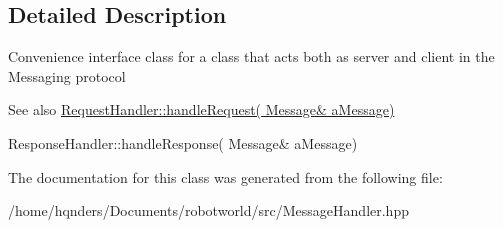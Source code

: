 \subsection{Detailed Description}
Convenience interface class for a class that acts both as server and client in the Messaging protocol \begin{DoxySeeAlso}{See also}
\hyperlink{class_messaging_1_1_request_handler_afa23f0ab94ae851a487173a5087da898}{Request\+Handler\+::handle\+Request( Message\& a\+Message)} 

Response\+Handler\+::handle\+Response( Message\& a\+Message) 
\end{DoxySeeAlso}


The documentation for this class was generated from the following file\+:\begin{DoxyCompactItemize}
\item 
/home/hqnders/\+Documents/robotworld/src/Message\+Handler.\+hpp\end{DoxyCompactItemize}

